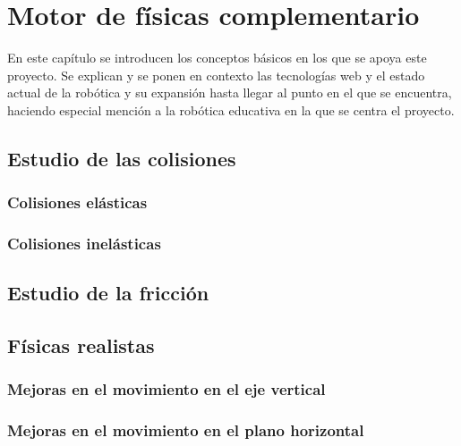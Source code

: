 \chapter{Motor de físicas complementario}
\label{chap:motor_fisicas} 
En este capítulo se introducen los conceptos básicos en los que se apoya este proyecto. Se explican y se ponen en contexto las tecnologías web y el estado actual de la robótica y su expansión hasta llegar al punto en el que se encuentra, haciendo especial mención a la robótica educativa en la que se centra el proyecto.
   
\section{Estudio de las colisiones}
\subsection{Colisiones elásticas}
\subsection{Colisiones inelásticas}


\section{Estudio de la fricción}

\section{Físicas realistas}
\subsection{Mejoras en el movimiento en el eje vertical}
\subsection{Mejoras en el movimiento en el plano horizontal}



